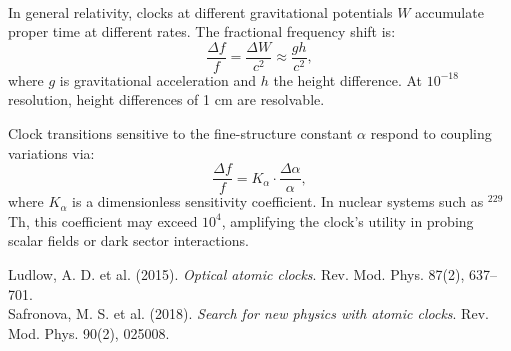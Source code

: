 \begin{technical}
\\[0.5em]
In general relativity, clocks at different gravitational potentials $W$ accumulate proper time at different rates. The fractional frequency shift is:
\[
\frac{\Delta f}{f} = \frac{\Delta W}{c^2} \approx \frac{gh}{c^2},
\]
where $g$ is gravitational acceleration and $h$ the height difference. At $10^{-18}$ resolution, height differences of 1 cm are resolvable.

Clock transitions sensitive to the fine-structure constant $\alpha$ respond to coupling variations via:
\[
\frac{\Delta f}{f} = K_\alpha \cdot \frac{\Delta \alpha}{\alpha},
\]
where $K_\alpha$ is a dimensionless sensitivity coefficient. In nuclear systems such as $^{229}$Th, this coefficient may exceed $10^4$, amplifying the clock’s utility in probing scalar fields or dark sector interactions.

\techref
{\footnotesize
Ludlow, A. D. et al. (2015). \textit{Optical atomic clocks}. Rev. Mod. Phys. 87(2), 637–701.\\
Safronova, M. S. et al. (2018). \textit{Search for new physics with atomic clocks}. Rev. Mod. Phys. 90(2), 025008.
}
\end{technical}
